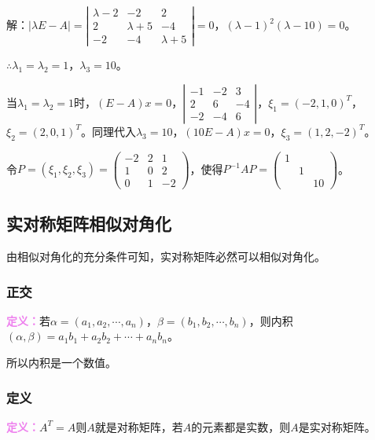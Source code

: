 \documentclass[UTF8, 12pt]{ctexart}
\begin{document}
解：$\vert\lambda E-A\vert=\left|\begin{array}{ccc}
    \lambda-2 & -2 & 2 \\
    2 & \lambda+5 & -4 \\
    -2 & -4 & \lambda+5
\end{array}\right|=0$，$(\lambda-1)^2(\lambda-10)=0$。

$\therefore\lambda_1=\lambda_2=1$，$\lambda_3=10$。

当$\lambda_1=\lambda_2=1$时，$(E-A)x=0$，$\left|\begin{array}{ccc}
    -1 & -2 & 3 \\
    2 & 6 & -4 \\
    -2 & -4 & 6
\end{array}\right|$，$\xi_1=(-2,1,0)^T$，$\xi_2=(2,0,1)^T$。同理代入$\lambda_3=10$，$(10E-A)x=0$，$\xi_3=(1,2,-2)^T$。

令$P=(\xi_1,\xi_2,\xi_3)=\left(\begin{array}{ccc}
    -2 & 2 & 1 \\
    1 & 0 & 2 \\
    0 & 1 & -2
\end{array}\right)$，使得$P^{-1}AP=\left(\begin{array}{ccc}
    1 \\
     & 1 \\
     & & 10
\end{array}\right)$。

\subsection{实对称矩阵相似对角化}

由相似对角化的充分条件可知，实对称矩阵必然可以相似对角化。

\subsubsection{正交}

\textcolor{violet}{\textbf{定义：}}若$\alpha=(a_1,a_2,\cdots,a_n)$，$\beta=(b_1,b_2,\cdots,b_n)$，则内积$(\alpha,\beta)=a_1b_1+a_2b_2+\cdots+a_nb_n$。

所以内积是一个数值。

\subsubsection{定义}

\textcolor{violet}{\textbf{定义：}}$A^T=A$则$A$就是对称矩阵，若$A$的元素都是实数，则$A$是实对称矩阵。
\end{document}

